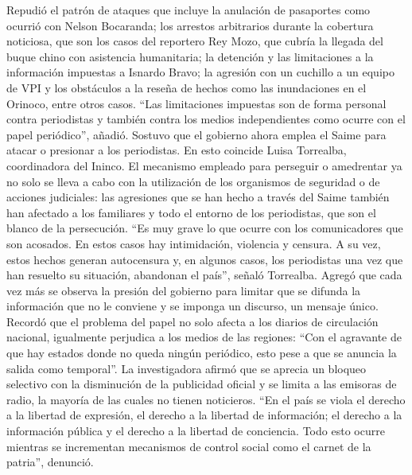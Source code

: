 \documentclass{article}%
\begin{document}
%
Repudió el patrón de ataques que incluye la anulación de pasaportes como ocurrió con Nelson Bocaranda; los arrestos arbitrarios durante la cobertura noticiosa, que son los casos del reportero Rey Mozo, que cubría la llegada del buque chino con asistencia humanitaria; la detención y las limitaciones a la información impuestas a Isnardo Bravo; la agresión con un cuchillo a un equipo de VPI y los obstáculos a la reseña de hechos como las inundaciones en el Orinoco, entre otros casos.%
\newline%
%
“Las limitaciones impuestas son de forma personal contra periodistas y también contra los medios independientes como ocurre con el papel periódico”, añadió.%
\newline%
%
Sostuvo que el gobierno ahora emplea el Saime para atacar o presionar a los periodistas. En esto coincide Luisa Torrealba, coordinadora del Ininco. El mecanismo empleado para perseguir o amedrentar ya no solo se lleva a cabo con la utilización de los organismos de seguridad o de acciones judiciales: las agresiones que se han hecho a través del Saime también han afectado a los familiares y todo el entorno de los periodistas, que son el blanco de la persecución.%
\newline%
%
“Es muy grave lo que ocurre con los comunicadores que son acosados. En estos casos hay intimidación, violencia y censura. A su vez, estos hechos generan autocensura y, en algunos casos, los periodistas una vez que han resuelto su situación, abandonan el país”, señaló Torrealba.%
\newline%
%
Agregó que cada vez más se observa la presión del gobierno para limitar que se difunda la información que no le conviene y se imponga un discurso, un mensaje único.%
\newline%
%
Recordó que el problema del papel no solo afecta a los diarios de circulación nacional, igualmente perjudica a los medios de las regiones: “Con el agravante de que hay estados donde no queda ningún periódico, esto pese a que se anuncia la salida como temporal”.%
\newline%
%
La investigadora afirmó que se aprecia un bloqueo selectivo con la disminución de la publicidad oficial y se limita a las emisoras de radio, la mayoría de las cuales no tienen noticieros.%
\newline%
%
“En el país se viola el derecho a la libertad de expresión, el derecho a la libertad de información; el derecho a la información pública y el derecho a la libertad de conciencia. Todo esto ocurre mientras se incrementan mecanismos de control social como el carnet de la patria”, denunció.%
\end{document}
